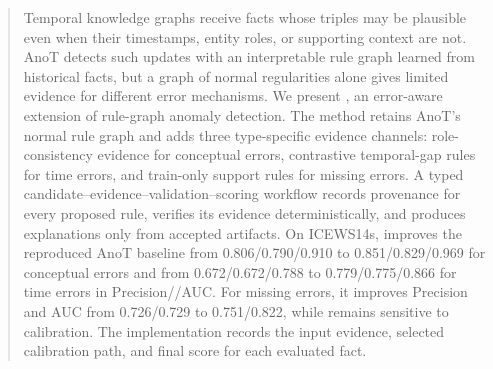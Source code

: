 \begin{abstract}
Temporal knowledge graphs receive facts whose triples may be plausible even when their timestamps, entity roles, or supporting context are not. AnoT detects such updates with an interpretable rule graph learned from historical facts, but a graph of normal regularities alone gives limited evidence for different error mechanisms. We present \method, an error-aware extension of rule-graph anomaly detection. The method retains AnoT's normal rule graph and adds three type-specific evidence channels: role-consistency evidence for conceptual errors, contrastive temporal-gap rules for time errors, and train-only support rules for missing errors. A typed candidate--evidence--validation--scoring workflow records provenance for every proposed rule, verifies its evidence deterministically, and produces explanations only from accepted artifacts. On ICEWS14s, \method improves the reproduced AnoT baseline from 0.806/0.790/0.910 to 0.851/0.829/0.969 for conceptual errors and from 0.672/0.672/0.788 to 0.779/0.775/0.866 for time errors in Precision/\fbeta/AUC. For missing errors, it improves Precision and AUC from 0.726/0.729 to 0.751/0.822, while \fbeta remains sensitive to calibration. The implementation records the input evidence, selected calibration path, and final score for each evaluated fact.
\end{abstract}
